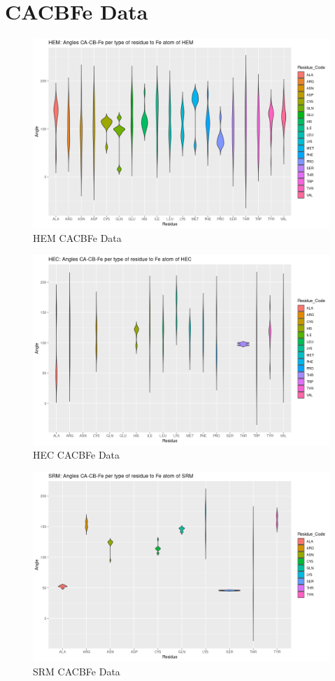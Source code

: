 \section{CACBFe Data}
	\begin{figure}
		\caption{HEM CACBFe Data}
		\label{figs:HEM_cab7}
		\includegraphics[width=\linewidth]{7A/HEM_cab}
	\end{figure}

	\begin{figure}
		\caption{HEC CACBFe Data}
		\label{figs:HEC_cab7}
		\includegraphics[width=\linewidth]{7A/HEC_cab}
	\end{figure}
	
	\begin{figure}
		\caption{SRM CACBFe Data}
		\label{figs:SRM_cab7}
		\includegraphics[width=\linewidth]{7A/SRM_cab}
	\end{figure}
	
